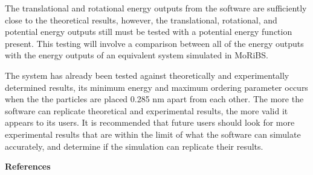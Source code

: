 \documentclass{ece}
\begin{document}
The translational and rotational energy outputs from the software are sufficiently close to the theoretical results, however, the translational, rotational, and potential energy outputs still must be tested with a potential energy function present. This testing will involve a comparison between all of the energy outputs with the energy outputs of an equivalent system simulated in \gls{MoRiBS}. 

The system has already been tested against theoretically and experimentally determined results, its minimum energy and maximum ordering parameter occurs when the the particles are placed 0.285 nm apart from each other. The more the software can replicate theoretical and experimental results, the more valid it appears to its users. It is recommended that future users should look for more experimental results that are within the limit of what the software can simulate accurately, and determine if the simulation can replicate their results. 


\printglossaries


\vspace{13cm}

\LARGE{\textbf{References}} \\ 
\end{document}
